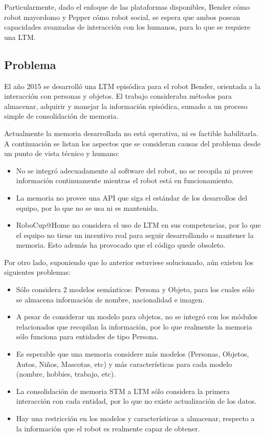 Particularmente, dado el enfoque de las plataformas disponibles, Bender cómo robot mayordomo y Pepper cómo robot social, se espera que ambos posean capacidades avanzadas de interacción con los humanos, para lo que se requiere una LTM.


\subsection{Problema}

El año 2015 se desarrolló una LTM episódica para el robot Bender, orientada a la interacción con personas y objetos\cite{Sanchez:2015}. El trabajo consideraba métodos para almacenar, adquirir y manejar la información episódica, sumado a un proceso simple de consolidación de memoria.

Actualmente la memoria desarrollada no está operativa, ni es factible habilitarla. A continuación se listan los aspectos que se consideran causas del problema desde un punto de vista técnico y humano:
\begin{itemize}
\item No se integró adecuadamente al software del robot, no se recopila ni provee información continuamente mientras el robot está en funcionamiento.
\item La memoria no provee una API que siga el estándar de los desarrollos del equipo, por lo que no se usa ni es mantenida.
\item RoboCup@Home no considera el uso de LTM en sus competencias, por lo que el equipo no tiene un incentivo real para seguir desarrollando o mantener la memoria. Esto además ha provocado que el código quede obsoleto.
\end{itemize}

Por otro lado, suponiendo que lo anterior estuviese solucionado, aún existen los siguientes problemas:
\begin{itemize}
\item Sólo considera 2 modelos semánticos: Persona y Objeto, para los cuales sólo se almacena información de nombre, nacionalidad e imagen.
\item A pesar de considerar un modelo para objetos, no se integró con los módulos relacionados que recopilan la información, por lo que realmente la memoria sólo funciona para entidades de tipo Persona.
\item Es esperable que una memoria considere más modelos (Personas, Objetos, Autos, Niños, Mascotas, etc) y más características para cada modelo (nombre, hobbies, trabajo, etc).
\item La consolidación de memoria STM a LTM sólo considera la primera interacción con cada entidad, por lo que no existe actualización de los datos.
\item Hay una restricción en los modelos y características a almacenar, respecto a la información que el robot es realmente capaz de obtener.
\end{itemize}


